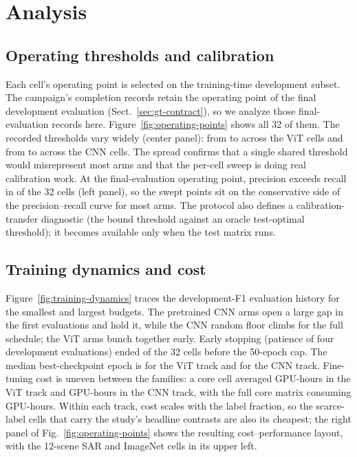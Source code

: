 \section{Analysis}
\label{sec:error-analysis}

\subsection{Operating thresholds and calibration}
\label{sec:threshold-transfer}

Each cell's operating point is selected on the training-time development
subset. The campaign's completion records retain the operating point of the
final development evaluation (Sect.~\ref{sec:gt-contract}), so we analyze
those final-evaluation records here. Figure~\ref{fig:operating-points} shows
all 32 of them. The recorded thresholds vary widely (center panel): from
\ThreshMinVit{} to \ThreshMaxVit{} across the ViT cells and from
\ThreshMinCnn{} to \ThreshMaxCnn{} across the CNN cells. The spread confirms
that a single shared threshold would misrepresent most arms and that the
per-cell sweep is doing real calibration work. At the final-evaluation
operating point, precision exceeds recall in \CellsPrecOverRecall{} of the
32 cells (left panel), so the swept points sit on the conservative side of
the precision--recall curve for most arms. The protocol also defines a
calibration-transfer diagnostic (the bound threshold against an oracle
test-optimal threshold); it becomes available only when the test matrix
runs.



\subsection{Training dynamics and cost}
\label{sec:training-dynamics}

Figure~\ref{fig:training-dynamics} traces the development-F1 evaluation
history for the smallest and largest budgets. The pretrained CNN arms open a
large gap in the first evaluations and hold it, while the CNN random floor
climbs for the full schedule; the ViT arms bunch together early. Early
stopping (patience of four development evaluations) ended
\CellsEarlyStopped{} of the 32 cells before the 50-epoch cap. The median
best-checkpoint epoch is \MedianBestEpochVit{} for the ViT track and
\MedianBestEpochCnn{} for the CNN track. Fine-tuning cost is uneven between
the families: a core cell averaged \MeanCellHoursVit{} GPU-hours in the ViT
track and \MeanCellHoursCnn{} GPU-hours in the CNN track, with the full core
matrix consuming \ResultCoreGPUHours{} GPU-hours. Within each track, cost
scales with the label fraction, so the scarce-label cells that carry the
study's headline contrasts are also its cheapest; the right panel of
Fig.~\ref{fig:operating-points} shows the resulting cost--performance
layout, with the 12-scene SAR and ImageNet cells in its upper left.

